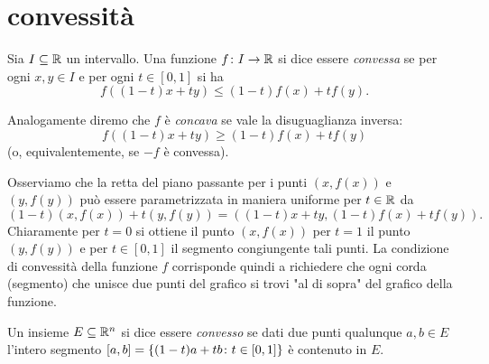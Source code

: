 \section{convessità}
%
%

\begin{definition}
\mymark{**}
Sia $I\subseteq {\mathbb R}$ un intervallo.
Una funzione $f\colon I\to {\mathbb R}$
si dice essere
\emph{convessa}
%
%
%
se per ogni $x,y\in I$ e per ogni $t\in [0,1]$ si ha
\[
f((1-t)x + ty) \le (1-t) f(x) + t f(y).
\]

Analogamente diremo che $f$ è \emph{concava} 
%
%
%
se vale la disuguaglianza inversa:
\[
f((1-t)x + ty) \ge (1-t) f(x) + t f(y)
\]
(o, equivalentemente, se $-f$ è convessa).
\end{definition}

Osserviamo che la retta del piano passante per i punti $(x,f(x))$ e $(y,f(y))$ può essere parametrizzata in maniera uniforme per $t\in {\mathbb R}$
da
\[
  (1-t) (x,f(x)) + t(y,f(y)) = ((1-t)x + ty, (1-t) f(x) + tf(y)).
\]
Chiaramente per $t=0$ si ottiene il punto $(x,f(x))$ per $t=1$ il punto $(y,f(y))$ e per $t\in[0,1]$ il segmento congiungente tali punti. La condizione di convessità della funzione $f$ corrisponde quindi a richiedere che ogni corda (segmento) che unisce due punti del grafico si trovi "al di sopra" del grafico della funzione.

\begin{definition}
\mymark{*}
Un insieme $E\subseteq {\mathbb R}^n$ si dice essere \emph{convesso}%
%
 se dati
due punti qualunque $a,b\in E$ l'intero segmento $[a,b]={\left\{ (1-t)a+tb\colon t\in [0,1] \right\}}$ è contenuto in $E$.
\end{definition}

